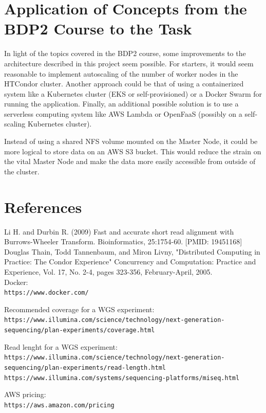 \documentclass{article}
\begin{document}
\section{Application of Concepts from the BDP2 Course to the Task}
In light of the topics covered in the BDP2 course, some improvements to the architecture described in this project seem possible.
For starters, it would seem reasonable to implement autoscaling of the number of worker nodes in the HTCondor cluster.
Another approach could be that of using a containerized system like a Kubernetes cluster (EKS or self-provisioned) or a Docker Swarm for running the application.
Finally, an additional possible solution is to use a serverless computing system like AWS Lambda or OpenFaaS (possibly on a self-scaling Kubernetes cluster).

Instead of using a shared NFS volume mounted on the Master Node, it could be more logical to store data on an AWS S3 bucket.
This would reduce the strain on the vital Master Node and make the data more easily accessible from outside of the cluster.

\section{References}
Li H. and Durbin R. (2009) Fast and accurate short read alignment with Burrows-Wheeler Transform. Bioinformatics, 25:1754-60. [PMID: 19451168]\\

Douglas Thain, Todd Tannenbaum, and Miron Livny, "Distributed Computing in Practice: The Condor Experience" Concurrency and Computation: Practice and Experience, Vol. 17, No. 2-4, pages 323-356, February-April, 2005.\\

Docker:\\
\texttt{https://www.docker.com/}

Recommended coverage for a WGS experiment:\\
\texttt{https://www.illumina.com/science/technology/next-generation-sequencing/plan-experiments/coverage.html}

Read lenght for a WGS experiment:\\
\texttt{https://www.illumina.com/science/technology/next-generation-sequencing/plan-experiments/read-length.html}\\
\texttt{https://www.illumina.com/systems/sequencing-platforms/miseq.html}

AWS pricing:\\
\texttt{https://aws.amazon.com/pricing}
\end{document}
